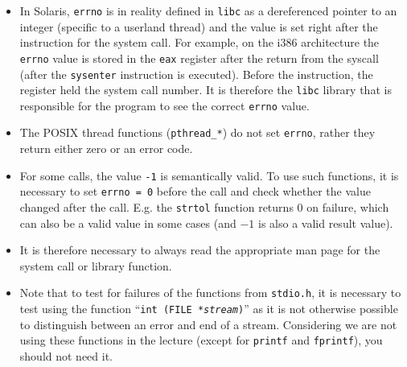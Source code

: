 \begin{itemize}
\item \label{ERRNO} In Solaris, \texttt{errno} is in reality defined in
\texttt{libc} as a dereferenced pointer to an integer (specific to a userland thread)
and the value is set right after the instruction for the system call.
For example, on the i386 architecture the \texttt{errno} value is stored in the
\texttt{eax} register after the return from the syscall (after the
\texttt{sysenter} instruction is executed). Before the instruction, the register
held the system call number. It is therefore the \texttt{libc} library that is
responsible for the program to see the correct \texttt{errno} value.
\item The POSIX thread functions (\texttt{pthread\_*}) do not set
\texttt{errno}, rather they return either zero or an error code.
\item For some calls, the value \texttt{-1} is semantically valid. To use such
functions, it is necessary to set \texttt{errno~=~0} before the call and check
whether the value changed after the call. E.g. the \texttt{strtol} function
returns 0 on failure, which can also be a valid value in some cases
(and $-1$ is also a valid result value).
\item It is therefore necessary to always read the appropriate man page for the 
system call or library function.
\item Note that to test for failures of the functions from \texttt{stdio.h}, it
is necessary to test using the function ``\texttt{int (FILE
*\emph{stream})}'' as it is not otherwise possible to distinguish between an
error and end of a stream. Considering we are not using these functions in the
lecture (except for \texttt{printf} and \texttt{fprintf}), you should not need
it.
\end{itemize}

